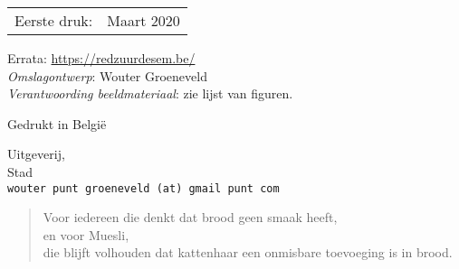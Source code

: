 \begin{center}
\begin{tabular}{ll}
Eerste druk:  & Maart 2020 \\
\end{tabular}
\end{center}

\vfill

Errata: \url{https://redzuurdesem.be/} \\

\hspace*{2em} \textit{Omslagontwerp}: Wouter Groeneveld \\
\hspace*{2em} \textit{Verantwoording beeldmateriaal}: zie lijst van figuren. \\

\vfill

Gedrukt in België

Uitgeverij, \\
Stad \\
\texttt{wouter punt groeneveld (at) gmail punt com}

\vspace*{2\baselineskip}
\clearpage


 \newenvironment{dedication}
     {\vspace{6ex}\begin{quotation}\begin{center}\begin{em}}
     {\par\end{em}\end{center}\end{quotation}}

\begin{dedication}
	Voor iedereen die denkt dat brood geen smaak heeft, \\
	en voor Muesli, \\
  die blijft volhouden dat kattenhaar een onmisbare toevoeging is in brood. 
\end{dedication}

\endgroup
\clearpage


\pagestyle{empty}

\renewcommand*\contentsname{Inhoudsopgave}
{
  \setcounter{tocdepth}{2}
  \tableofcontents*
}

\clearpage
\pagestyle{desem}

